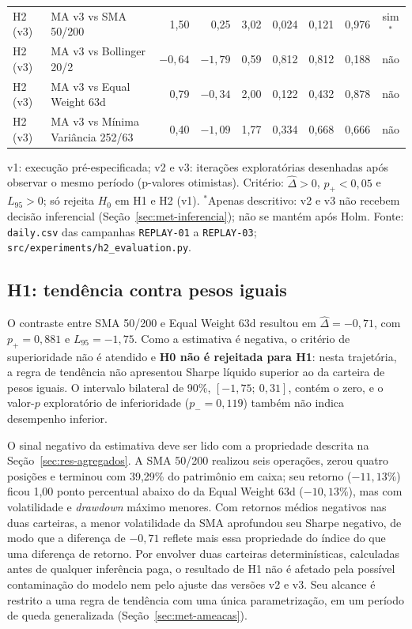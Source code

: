 \documentclass{eic-bcc-tcc}
\begin{document}
\begin{table}[htbp]
{\begin{tabular}{llrrrrrrc}
H2 (v3) & MA v3 vs SMA 50/200 & 1{,}50 & 0{,}25 & 3{,}02 & 0{,}024 & 0{,}121 & 0{,}976 & sim$^{*}$ \\
H2 (v3) & MA v3 vs Bollinger 20/2 & $-0{,}64$ & $-1{,}79$ & 0{,}59 & 0{,}812 & 0{,}812 & 0{,}188 & não \\
H2 (v3) & MA v3 vs Equal Weight 63d & 0{,}79 & $-0{,}34$ & 2{,}00 & 0{,}122 & 0{,}432 & 0{,}878 & não \\
H2 (v3) & MA v3 vs Mínima Variância 252/63 & 0{,}40 & $-1{,}09$ & 1{,}77 & 0{,}334 & 0{,}668 & 0{,}666 & não \\
\bottomrule
\end{tabular}}
\par\smallskip\footnotesize v1: execução pré-especificada; v2 e v3: iterações exploratórias desenhadas após observar o mesmo período (p-valores otimistas). Critério: $\hat{\Delta} > 0$, $p_+ < 0{,}05$ e $L_{95} > 0$; só rejeita $H_0$ em H1 e H2 (v1). $^{*}$Apenas descritivo: v2 e v3 não recebem decisão inferencial (Seção~\ref{sec:met-inferencia}); não se mantém após Holm. Fonte: \texttt{daily.csv} das campanhas \texttt{REPLAY-01} a \texttt{REPLAY-03}; \texttt{src/experiments/h2\_evaluation.py}.
\end{table}

\subsection{H1: tendência contra pesos iguais}
\label{sec:res-h1}

O contraste entre SMA 50/200 e Equal Weight 63d resultou em $\hat{\Delta} = -0{,}71$, com $p_{+} = 0{,}881$ e $L_{95} = -1{,}75$. Como a estimativa é negativa, o critério de superioridade não é atendido e \textbf{H0 não é rejeitada para H1}: nesta trajetória, a regra de tendência não apresentou Sharpe líquido superior ao da carteira de pesos iguais. O intervalo bilateral de 90\%, $[-1{,}75;\ 0{,}31]$, contém o zero, e o valor-$p$ exploratório de inferioridade ($p_{-} = 0{,}119$) também não indica desempenho inferior.

O sinal negativo da estimativa deve ser lido com a propriedade descrita na Seção~\ref{sec:res-agregados}. A SMA 50/200 realizou seis operações, zerou quatro posições e terminou com 39,29\% do patrimônio em caixa; seu retorno ($-11{,}13\%$) ficou 1,00 ponto percentual abaixo do da Equal Weight 63d ($-10{,}13\%$), mas com volatilidade e \textit{drawdown} máximo menores. Com retornos médios negativos nas duas carteiras, a menor volatilidade da SMA aprofundou seu Sharpe negativo, de modo que a diferença de $-0{,}71$ reflete mais essa propriedade do índice do que uma diferença de retorno. Por envolver duas carteiras determinísticas, calculadas antes de qualquer inferência paga, o resultado de H1 não é afetado pela possível contaminação do modelo nem pelo ajuste das versões v2 e v3. Seu alcance é restrito a uma regra de tendência com uma única parametrização, em um período de queda generalizada (Seção~\ref{sec:met-ameacas}).
\end{document}
